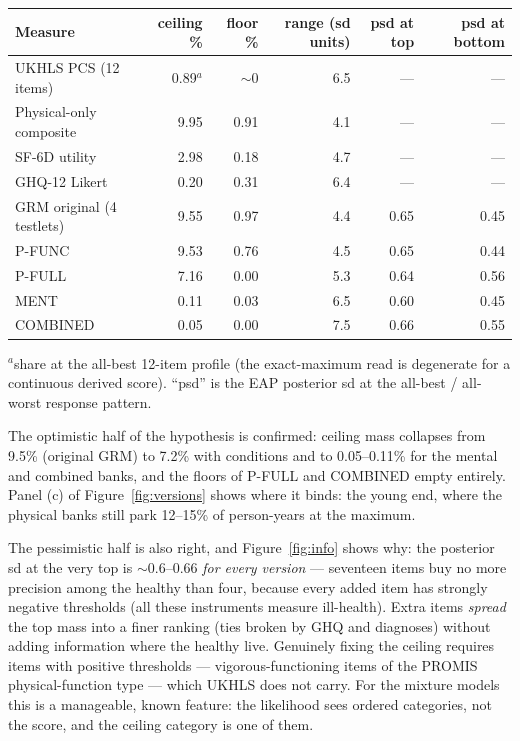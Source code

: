 \documentclass[11pt]{article}
\begin{document}
\begin{center}\small
\begin{tabular}{lrrrrr}
\toprule
Measure & ceiling \% & floor \% & range (sd units) & psd at top & psd at bottom \\
\midrule
UKHLS PCS (12 items) & 0.89$^{a}$ & $\sim$0 & 6.5 & --- & --- \\
Physical-only composite & 9.95 & 0.91 & 4.1 & --- & --- \\
SF-6D utility & 2.98 & 0.18 & 4.7 & --- & --- \\
GHQ-12 Likert & 0.20 & 0.31 & 6.4 & --- & --- \\
GRM original (4 testlets) & 9.55 & 0.97 & 4.4 & 0.65 & 0.45 \\
P-FUNC & 9.53 & 0.76 & 4.5 & 0.65 & 0.44 \\
P-FULL & 7.16 & 0.00 & 5.3 & 0.64 & 0.56 \\
MENT & 0.11 & 0.03 & 6.5 & 0.60 & 0.45 \\
COMBINED & 0.05 & 0.00 & 7.5 & 0.66 & 0.55 \\
\bottomrule
\end{tabular}

{\scriptsize $^{a}$share at the all-best 12-item profile (the exact-maximum
read is degenerate for a continuous derived score). ``psd'' is the EAP
posterior sd at the all-best / all-worst response pattern.}
\end{center}

The optimistic half of the hypothesis is confirmed: ceiling mass collapses
from 9.5\% (original GRM) to 7.2\% with conditions and to 0.05--0.11\% for
the mental and combined banks, and the floors of P-FULL and COMBINED empty
entirely. Panel (c) of Figure~\ref{fig:versions} shows where it binds: the
young end, where the physical banks still park 12--15\% of person-years at
the maximum.

The pessimistic half is also right, and Figure~\ref{fig:info} shows why: the
posterior sd at the very top is $\sim$0.6--0.66 \emph{for every version} ---
seventeen items buy no more precision among the healthy than four, because
every added item has strongly negative thresholds (all these instruments
measure ill-health). Extra items \emph{spread} the top mass into a finer
ranking (ties broken by GHQ and diagnoses) without adding information where
the healthy live. Genuinely fixing the ceiling requires items with positive
thresholds --- vigorous-functioning items of the PROMIS physical-function
type --- which UKHLS does not carry. For the mixture models this is a
manageable, known feature: the likelihood sees ordered categories, not the
score, and the ceiling category is one of them.
\end{document}
